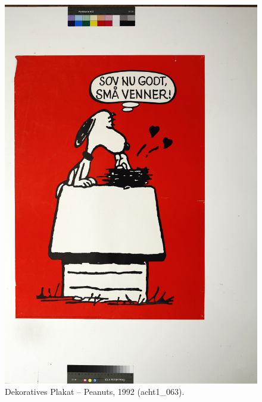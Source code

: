 \documentclass[a4paper,12pt,ngerman]{article}
\begin{document}
\newpage
\begin{figure}[ht]
\includegraphics[width=\linewidth]{Abbildung_22_(acht1_063)}
\centering
\caption{Dekoratives Plakat -- Peanuts, 1992 (acht1\_063).}
\end{figure}
\end{document}
